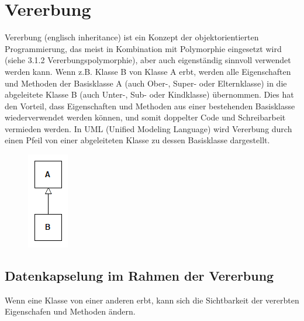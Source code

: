 \section{Vererbung}
	Vererbung (englisch inheritance) ist ein Konzept der objektorientierten Programmierung, das meist in Kombination mit
	Polymorphie eingesetzt wird (siehe 3.1.2 Vererbungspolymorphie), aber auch eigenständig sinnvoll verwendet werden kann.
	Wenn z.B. Klasse B von Klasse A erbt, werden alle Eigenschaften und Methoden der Basisklasse A (auch Ober-, Super- oder
	Elternklasse) in die abgeleitete Klasse B (auch Unter-, Sub- oder Kindklasse) übernommen. Dies hat den Vorteil, dass
	Eigenschaften und Methoden aus einer bestehenden Basisklasse wiederverwendet werden können, und somit doppelter Code und
	Schreibarbeit vermieden werden. In UML (Unified Modeling Language) wird Vererbung durch einen Pfeil von einer abgeleiteten
	Klasse zu dessen Basisklasse dargestellt.
	
	\begin{figure}[H]
		\includegraphics[scale=0.75]{vererbung/uml.png}
	\end{figure}
	
	\subsection{Datenkapselung im Rahmen der Vererbung}
		Wenn eine Klasse von einer anderen erbt, kann sich die Sichtbarkeit der vererbten Eigenschafen und Methoden ändern.
		
		
		
